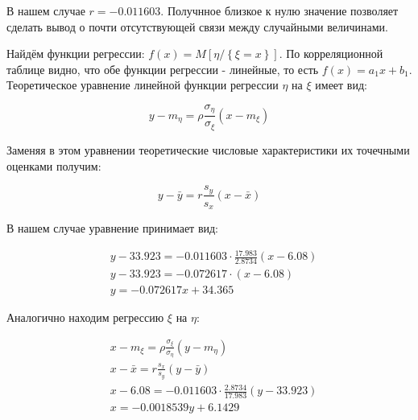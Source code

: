 \documentclass{report}
\begin{document}
В нашем случае $r = -0.011603$. Получнное близкое к нулю значение позволяет сделать вывод о почти отсутствующей связи между случайными величинами. 

Найдём функции регрессии: $f(x) = M\left[\eta / \left\{\xi = x\right\}\right]$.
По корреляционной таблице видно, что обе функции регрессии - линейные, то есть $f(x) = a_1x+b_1$. Теоретическое уравнение линейной функции регрессии $\eta$ на $\xi$ имеет вид:

\begin{equation}
y - m_\eta = \rho \frac{\sigma_\eta}{\sigma_\xi} \left( x - m_\xi \right)
\end{equation}

Заменяя в этом уравнении теоретические числовые характеристики их точечными оценками получим:

\begin{equation}
y - \bar y = r \frac{s_y}{s_x} \left( x - \bar x \right)
\end{equation}

В нашем случае уравнение принимает вид:

\begin{equation}
\begin{split}
& y - 33.923 = -0.011603 \cdot \frac{17.983}{2.8734} \left(x - 6.08\right) \\
& y - 33.923 = -0.072617 \cdot \left(x - 6.08\right) \\
& y = -0.072617 x + 34.365
\end{split}
\end{equation}

Аналогично находим регрессию $\xi$ на $\eta$:

\begin{equation}
\begin{split}
& x - m_\xi = \rho \frac{\sigma_\xi}{\sigma_\eta} \left( y - m_\eta \right) \\
& x - \bar x = r \frac{s_x}{s_y} \left( y - \bar y \right) \\
& x - 6.08 = -0.011603 \cdot \frac{2.8734}{17.983} \left(y - 33.923\right) \\
& x = -0.0018539 y + 6.1429
\end{split}
\end{equation}

\newpage

\begin{figure}[h] \label{fig:4}
\centering
{}
\end{figure}
\end{document}
